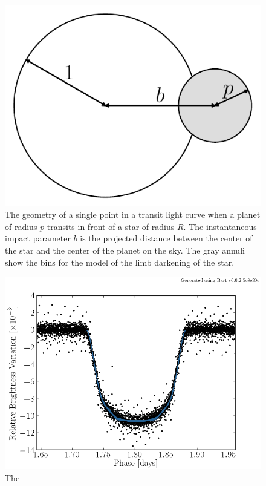 \documentclass[12pt,preprint]{aastex}
\newcommand{\figlabel}[1]{\label{fig:#1}}
\begin{document}
\clearpage

\begin{figure}[htbp]
    \begin{center}
        \includegraphics[width=\textwidth]{figures/geom.pdf}
    \end{center}
    \caption{The geometry of a single point in a transit light curve when a
        planet of radius $p$ transits in front of a star of radius $R$. The
        instantaneous impact parameter $b$ is the projected distance between
        the center of the star and the center of the planet on the sky. The
        gray annuli show the bins for the model of the limb darkening of the
        star. \figlabel{geom}}
\end{figure}

\begin{figure}[htbp]
    \begin{center}
        \includegraphics[width=\textwidth]{figures/kepler6/lightcurves/0.png}
    \end{center}
    \caption{The \figlabel{kep6-lc}}
\end{figure}
\end{document}
